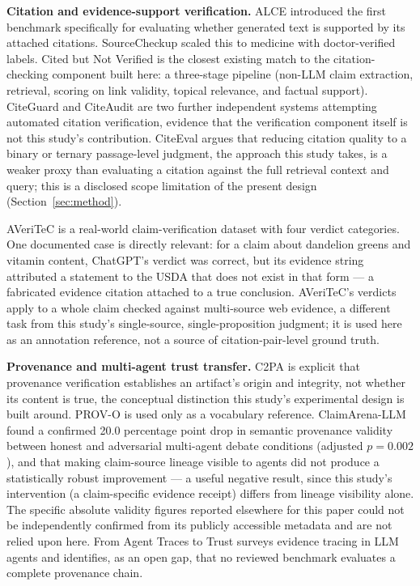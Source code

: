 \documentclass[11pt]{article}
\begin{document}
\textbf{Citation and evidence-support verification.} ALCE
\citep{gao2023alce} introduced the first benchmark specifically for
evaluating whether generated text is supported by its attached citations.
SourceCheckup \citep{wu2025sourcecheckup} scaled this to medicine with
doctor-verified labels. Cited but Not Verified
\citep{onweller2026citedbutnotverified} is the closest existing match to the
citation-checking component built here: a three-stage pipeline (non-LLM claim
extraction, retrieval, scoring on link validity, topical relevance, and factual
support). CiteGuard \citep{choi2026citeguard} and CiteAudit
\citep{shi2026citeaudit} are two further independent systems attempting automated
citation verification, evidence that the verification component itself is not this
study's contribution. CiteEval \citep{xu2025citeeval} argues that reducing citation
quality to a binary or ternary passage-level judgment, the approach this study takes,
is a weaker proxy than evaluating a citation against the full retrieval context and
query; this is a disclosed scope limitation of the present design (Section~\ref{sec:method}).

AVeriTeC \citep{schlichtkrull2023averitec} is a real-world claim-verification dataset
with four verdict categories. One documented case is directly relevant: for a claim
about dandelion greens and vitamin content, ChatGPT's verdict was correct, but its
evidence string attributed a statement to the USDA that does not exist in that form
--- a fabricated evidence citation attached to a true conclusion. AVeriTeC's verdicts
apply to a whole claim checked against multi-source web evidence, a different task
from this study's single-source, single-proposition judgment; it is used here as an
annotation reference, not a source of citation-pair-level ground truth.

\textbf{Provenance and multi-agent trust transfer.} C2PA \citep{c2pa2024spec} is
explicit that provenance verification establishes an artifact's origin and integrity,
not whether its content is true, the conceptual distinction this study's experimental
design is built around. PROV-O \citep{w3c2013provo} is used only as a vocabulary
reference. ClaimArena-LLM \citep{anghel2026claimarena} found a confirmed 20.0
percentage point drop in semantic provenance validity between honest and adversarial
multi-agent debate conditions (adjusted $p=0.002$), and that making claim-source
lineage visible to agents did not produce a statistically robust improvement --- a
useful negative result, since this study's intervention (a claim-specific evidence
receipt) differs from lineage visibility alone. The specific absolute validity
figures reported elsewhere for this paper could not be independently confirmed from
its publicly accessible metadata and are not relied upon here. From Agent Traces to
Trust \citep{wang2026agenttraces} surveys evidence tracing in LLM agents and
identifies, as an open gap, that no reviewed benchmark evaluates a complete
provenance chain.
\end{document}
